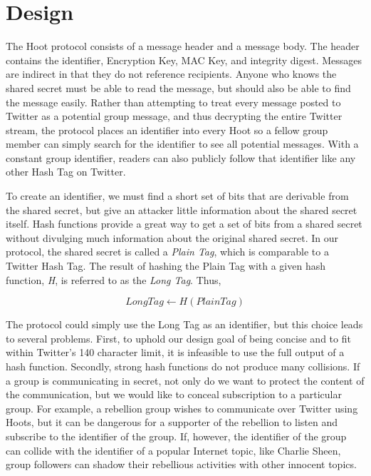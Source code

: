 \section{Design}

The Hoot protocol consists of a message header and a message body. The header contains the identifier, Encryption Key, MAC Key, and integrity digest. Messages are indirect in that they do not reference recipients. Anyone who knows the shared secret must be able to read the message, but should also be able to find the message easily. Rather than attempting to treat every message posted to Twitter as a potential group message, and thus decrypting the entire Twitter stream, the protocol places an identifier into every Hoot so a fellow group member can simply search for the identifier to see all potential messages. With a constant group identifier, readers can also publicly follow that identifier like any other Hash Tag on Twitter.

To create an identifier, we must find a short set of bits that are derivable from the shared secret, but give an attacker little information about the shared secret itself. Hash functions provide a great way to get a set of bits from a shared secret without divulging much information about the original shared secret. In our protocol, the shared secret is called a \textit{Plain Tag}, which is comparable to a Twitter Hash Tag. The result of hashing the Plain Tag with a given hash function, \textit{H}, is referred to as the \textit{Long Tag}. Thus,

\begin{equation*}
	\mathit{LongTag} \leftarrow H\left(\mathit{PlainTag}\right)
\end{equation*} 

The protocol could simply use the Long Tag as an identifier, but this choice leads to several problems. First, to uphold our design goal of being concise and to fit within Twitter's 140 character limit, it is infeasible to use the full output of a hash function. Secondly, strong hash functions do not produce many collisions. If a group is communicating in secret, not only do we want to protect the content of the communication, but we would like to conceal subscription to a particular group. For example, a rebellion group wishes to communicate over Twitter using Hoots, but it can be dangerous for a supporter of the rebellion to listen and subscribe to the identifier of the group. If, however, the identifier of the group can collide with the identifier of a popular Internet topic, like Charlie Sheen, group followers can shadow their rebellious activities 
with other innocent topics. 

